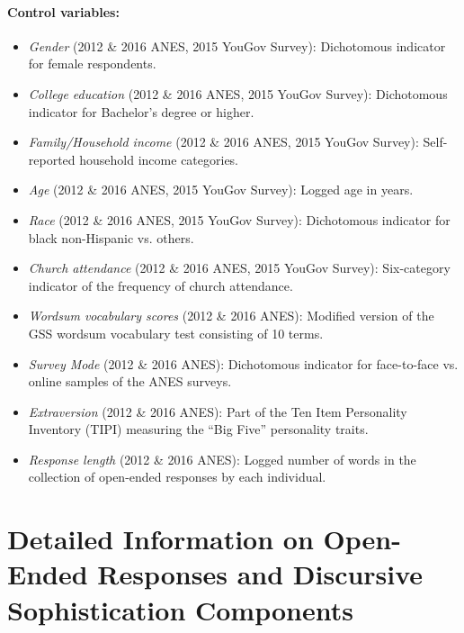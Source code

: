 \paragraph{Control variables:}
\begin{itemize}
	\item \textit{Gender} (2012 \& 2016 ANES, 2015 YouGov Survey): Dichotomous indicator for female respondents.
	\item \textit{College education} (2012 \& 2016 ANES, 2015 YouGov Survey): Dichotomous indicator for Bachelor's degree or higher.
	\item \textit{Family/Household income} (2012 \& 2016 ANES, 2015 YouGov Survey): Self-reported household income categories.
	\item \textit{Age} (2012 \& 2016 ANES, 2015 YouGov Survey): Logged age in years.
	\item \textit{Race} (2012 \& 2016 ANES, 2015 YouGov Survey): Dichotomous indicator for black non-Hispanic vs. others.
	\item \textit{Church attendance} (2012 \& 2016 ANES, 2015 YouGov Survey): Six-category indicator of the frequency of church attendance. 
	\item \textit{Wordsum vocabulary scores}  (2012 \& 2016 ANES): Modified version of the GSS wordsum vocabulary test consisting of 10 terms.
	\item \textit{Survey Mode} (2012 \& 2016 ANES): Dichotomous indicator for face-to-face vs. online samples of the ANES surveys.
	\item \textit{Extraversion} (2012 \& 2016 ANES): Part of the Ten Item Personality Inventory (TIPI) measuring the ``Big Five'' personality traits.
	\item \textit{Response length} (2012 \& 2016 ANES): Logged number of words in the collection of open-ended responses by each individual.
\end{itemize}



\clearpage
\section[Information on Discursive Sophistication Components]{Detailed Information on Open-Ended Responses and Discursive Sophistication Components}\label{app:oeinfo}

